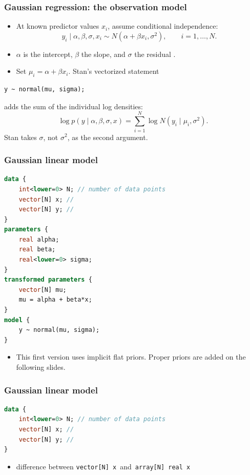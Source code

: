 \documentclass[10pt]{beamer}
\begin{document}
\begin{frame}[fragile]

\frametitle{Gaussian regression: the observation model}

\begin{itemize}
\item At known predictor values $x_i$, assume conditional independence:
\[
y_i\mid\alpha,\beta,\sigma,x_i
  \sim N(\alpha+\beta x_i,\sigma^2),\qquad i=1,\ldots,N.
\]
\item $\alpha$ is the intercept, $\beta$ the slope, and $\sigma$ the
  residual .
\pause
\item Set $\mu_i=\alpha+\beta x_i$. Stan's vectorized statement
\end{itemize}
{\small
\begin{lstlisting}[language=Stan]
y ~ normal(mu, sigma);
\end{lstlisting}
}
adds the sum of the individual log densities:
\[
\log p(y\mid\alpha,\beta,\sigma,x)
  =\sum_{i=1}^N\log N(y_i\mid\mu_i,\sigma^2).
\]
Stan takes $\sigma$, not $\sigma^2$, as the second argument.
\end{frame}

\begin{frame}[fragile]
\frametitle{Gaussian linear model}
  {\footnotesize
  \begin{lstlisting}[language=Stan]
data {
    int<lower=0> N; // number of data points
    vector[N] x; //
    vector[N] y; //
}
parameters {
    real alpha;
    real beta;
    real<lower=0> sigma;
}
transformed parameters {
    vector[N] mu;
    mu = alpha + beta*x;
}
model {
    y ~ normal(mu, sigma);
}
  \end{lstlisting}
}
\begin{itemize}
\item This first version uses implicit flat priors. Proper priors are added on the following slides.
\end{itemize}
\end{frame}

\begin{frame}[fragile]

\frametitle{Gaussian linear model}
  {\small
  \begin{lstlisting}[language=Stan]
data {
    int<lower=0> N; // number of data points
    vector[N] x; //
    vector[N] y; //
}
\end{lstlisting}
  }

  \begin{itemize}
  \item difference between {\tt vector[N] x}\, and\, {\tt array[N] real x}
  \end{itemize}
\end{frame}
\end{document}
